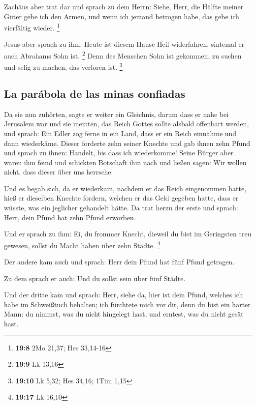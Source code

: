  Zachäus aber trat dar und sprach zu dem Herrn: Siehe,
Herr, die Hälfte meiner Güter gebe ich den Armen, und wenn ich jemand
betrogen habe, das gebe ich vierfältig wieder. \footnote{\textbf{19:8}
  2Mo 21,37; Hes 33,14-16}

 Jesus aber sprach zu ihm: Heute ist diesem Hause Heil
widerfahren, sintemal er auch Abrahams Sohn ist. \footnote{\textbf{19:9}
  Lk 13,16}  Denn des Menschen Sohn ist gekommen, zu
suchen und selig zu machen, das verloren ist. \footnote{\textbf{19:10}
  Lk 5,32; Hes 34,16; 1Tim 1,15}

\hypertarget{la-paruxe1bola-de-las-minas-confiadas}{%
\subsection{La parábola de las minas
confiadas}\label{la-paruxe1bola-de-las-minas-confiadas}}

 Da sie nun zuhörten, sagte er weiter ein Gleichnis,
darum dass er nahe bei Jerusalem war und sie meinten, das Reich Gottes
sollte alsbald offenbart werden,  und sprach: Ein Edler
zog ferne in ein Land, dass er ein Reich einnähme und dann wiederkäme.
 Dieser forderte zehn seiner Knechte und gab ihnen zehn
Pfund und sprach zu ihnen: Handelt, bis dass ich wiederkomme!
 Seine Bürger aber waren ihm feind und schickten
Botschaft ihm nach und ließen sagen: Wir wollen nicht, dass dieser über
uns herrsche.

 Und es begab sich, da er wiederkam, nachdem er das Reich
eingenommen hatte, hieß er dieselben Knechte fordern, welchen er das
Geld gegeben hatte, dass er wüsste, was ein jeglicher gehandelt hätte.
 Da trat herzu der erste und sprach: Herr, dein Pfund hat
zehn Pfund erworben.

 Und er sprach zu ihm: Ei, du frommer Knecht, dieweil du
bist im Geringsten treu gewesen, sollst du Macht haben über zehn Städte.
\footnote{\textbf{19:17} Lk 16,10}

 Der andere kam auch und sprach: Herr dein Pfund hat fünf
Pfund getragen.

 Zu dem sprach er auch: Und du sollst sein über fünf
Städte.

 Und der dritte kam und sprach: Herr, siehe da, hier ist
dein Pfund, welches ich habe im Schweißtuch behalten; 
ich fürchtete mich vor dir, denn du bist ein harter Mann: du nimmst, was
du nicht hingelegt hast, und erntest, was du nicht gesät hast.

